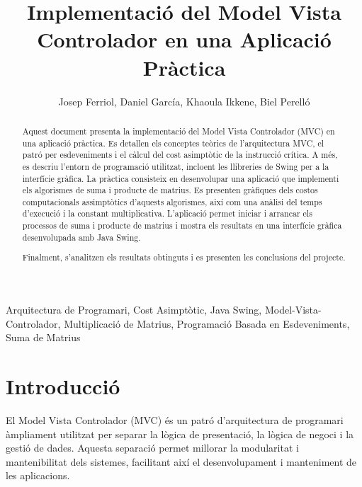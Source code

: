 \documentclass{ieeetj}
\begin{document}

\title{Implementació del Model Vista Controlador en una Aplicació Pràctica}

\author{Josep Ferriol, Daniel García, Khaoula Ikkene, Biel Perelló}

\begin{abstract}
Aquest document presenta la implementació del Model Vista Controlador (MVC) en una aplicació pràctica. Es detallen els conceptes teòrics de l’arquitectura MVC, el patró per esdeveniments i el càlcul del cost asimptòtic de la instrucció crítica. A més, es descriu l'entorn de programació utilitzat, incloent les llibreries de Swing per a la interfície gràfica. La pràctica consisteix en desenvolupar una aplicació que implementi els algorismes de suma i producte de matrius. Es presenten gràfiques dels costos computacionals assimptòtics d'aquests algorismes, així com una anàlisi del temps d'execució i la constant multiplicativa. L'aplicació permet iniciar i arrancar els processos de suma i producte de matrius i mostra els resultats en una interfície gràfica desenvolupada amb Java Swing.

Finalment, s'analitzen els resultats obtinguts i es presenten les conclusions del projecte.
\end{abstract}

\begin{IEEEkeywords}
Arquitectura de Programari, Cost Asimptòtic, Java Swing, Model-Vista-Controlador, Multiplicació de Matrius, Programació Basada en Esdeveniments, Suma de Matrius
\end{IEEEkeywords}

\maketitle
\section{Introducció}
El Model Vista Controlador (MVC) és un patró d'arquitectura de programari àmpliament utilitzat per separar la lògica de presentació, la lògica de negoci i la gestió de dades. Aquesta separació permet millorar la modularitat i mantenibilitat dels sistemes, facilitant així el desenvolupament i manteniment de les aplicacions.
\end{document}
